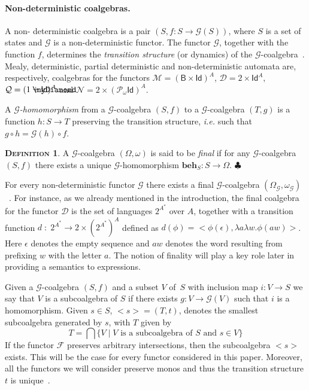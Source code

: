 \documentclass{LMCS}
\newcommand\D{\mathcal{D}}
\newcommand\N{\mathcal{N}}
\newcommand\M{\mathcal{M}}
\newcommand\Pa{\mathcal{Q}}
\def\pow{{\mathcal P_{\!\!\!\omega}}}
\newcommand\id{\mathsf{Id}}
\newcommand\B{\mathsf{B}}
\newcommand\G{\mathcal{G}}
\newcommand\F{\mathcal{F}}
\newcommand{\myplus}{\mathbin{\rlap{$\myDiamond$}\hspace*{.01cm}\raisebox{.14ex}{$+$}}}
\def\hyph{-\penalty0\hskip0pt\relax}
\theoremstyle{definition}
\newtheorem{mydefinition}{\textsc{Definition}}[section]
\theoremstyle{plain}
\theoremstyle{plain}
\theoremstyle{plain}
\theoremstyle{plain}
\theoremstyle{definition}
\theoremstyle{definition}
\newenvironment{definition}{
\begin{mydefinition}}
    {\hfill$\clubsuit$\end{mydefinition}}
\begin{document}
\paragraph{\textbf{Non-deterministic coalgebras.}} A {non\hyph
deterministic} coalgebra is a pair $(S, f\colon S\to \G(S))$, where
$S$ is a set of states and $\G$ is a non\hyph deterministic functor. 
 The functor $\G$, together with the
function $f$, determines the {\em transition structure} (or
dynamics) of the $\G$-coalgebra~\cite{Rutten00}. Mealy,
deterministic, partial deterministic and non\hyph deterministic
automata are, respectively, coalgebras for the functors
$\M =
(\B\times \id)^A$,
 $\D = 2 \times \id^A$, $\Pa= (1 \myplus \id)^A$ and $\N= 2
\times (\pow\id)^A $.

A {\em $\G$-homomorphism\/} from a $\G$-coalgebra $(S,f)$ to a
$\G$-coalgebra $(T,g)$ is a function $h\colon S \to T$ preserving the
transition structure, {\em i.e.} such that $g\circ h = \G(h) \circ
f$. 

\begin{definition}
A $\G$-coalgebra $(\Omega,\omega)$ is said to be {\em final} if
for any $\G$-coalgebra $(S,f)$ there exists a unique $\G$-homomorphism
 $\mathbf{beh}_S\colon S\to \Omega$. 
\end{definition}
For every non-deterministic functor $\G$
there exists a final $\G$-coalgebra $(\Omega_\G,
\omega_\G)$~\cite{Rutten00}. For instance, as we already mentioned in
the introduction, the final coalgebra for the functor $\D$ is the set
of languages $2^{A^*}$ over $A$, together with a transition function
$d\;:\;2^{A^*} \to 2\times(2^{A^*})^A $ defined as $d(\phi) =
<\phi(\epsilon), \lambda a\lambda w. \phi(aw)>$. Here $\epsilon$
denotes the empty sequence and $aw$ denotes the word resulting from
prefixing $w$ with the letter $a$. The notion of finality will play
a key role later in providing a semantics to expressions.

Given a $\G$-coalgebra $(S,f)$ and a subset $V$ of~$S$ with inclusion
map $i\colon V\to S$ we say that $V$ is a subcoalgebra of $S$ if there
exists $g\colon V\to \G(V)$ such that $i$ is a homomorphism.
Given $s\in
S$, $<s>=(T,t)$, denotes the smallest subcoalgebra generated by
$s$, with $T$ given by
\[
T = \bigcap \{V \mid V \text{ is a subcoalgebra of $S$ and } s\in V\}
\]
If the functor
$\F$ preserves arbitrary intersections, then the subcoalgebra $<s>$
exists. This will be the case for every functor considered in this
paper. Moreover, all the functors we will consider preserve
monos and thus the transition structure $t$ is
unique~\cite[Proposition 6.1]{Rutten00}. 
 
\end{document}

